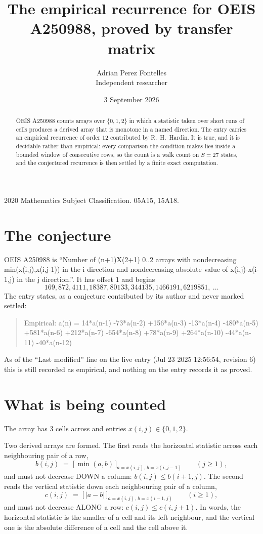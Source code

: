 \documentclass[11pt,a4paper]{article}
\title{The empirical recurrence for OEIS A250988, proved by transfer matrix}
\author{Adrian Perez Fontelles\\ \small Independent researcher}
\date{3 September 2026}
\theoremstyle{plain}
\theoremstyle{definition}
\begin{document}
\maketitle

\begin{abstract}
OEIS A250988 counts arrays over $\{0,1,2\}$ in which a statistic taken over short runs
of cells produces a derived array that is monotone in a named direction. The entry carries an
empirical recurrence of order $12$ contributed by R.~H.~Hardin. It is true, and it is
decidable rather than empirical: every comparison the condition makes lies inside a bounded
window of consecutive rows, so the count is a walk count on $S=27$ states, and the
conjectured recurrence is then settled by a finite exact computation.
\end{abstract}

\noindent\small 2020 Mathematics Subject Classification. 05A15, 15A18.\normalsize

\section{The conjecture}

OEIS A250988 is ``Number of (n+1)X(2+1) 0..2 arrays with nondecreasing min(x(i,j),x(i,j-1)) in the i direction and nondecreasing absolute value of x(i,j)-x(i-1,j) in the j direction.''. It has offset $1$ and begins
\[
169, 872, 4111, 18387, 80133, 344135, 1466191, 6219851,\ \dots
\]
The entry states, as a conjecture contributed by its author and never marked settled:
\begin{quote}
Empirical: a(n) = 14*a(n-1) -73*a(n-2) +156*a(n-3) -13*a(n-4) -480*a(n-5) +581*a(n-6) +212*a(n-7) -654*a(n-8) +78*a(n-9) +264*a(n-10) -44*a(n-11) -40*a(n-12)
\end{quote}
As of the ``Last modified'' line on the live entry (Jul 23 2025 12:56:54, revision 6) this is still
recorded as empirical, and nothing on the entry records it as proved.

\section{What is being counted}

The array has $3$ cells across and entries $x(i,j)\in\{0,1,2\}$.

Two derived arrays are formed. The first reads the horizontal statistic across each
neighbouring pair of a row,
\[
b(i,j)\;=\;\bigl[\,\min(a,b)\,\bigr]_{a=x(i,j),\,b=x(i,j-1)}\qquad (j\ge1),
\]
and must not decrease DOWN a column: $b(i,j)\le b(i{+}1,j)$. The second reads the vertical
statistic down each neighbouring pair of a column,
\[
c(i,j)\;=\;\bigl[\,\lvert a-b\rvert\,\bigr]_{a=x(i,j),\,b=x(i{-}1,j)}\qquad (i\ge1),
\]
and must not decrease ALONG a row: $c(i,j)\le c(i,j{+}1)$. In words, the horizontal statistic
is the smaller of a cell and its left neighbour, and the vertical one is
the absolute difference of a cell and the cell above it.
\end{document}
